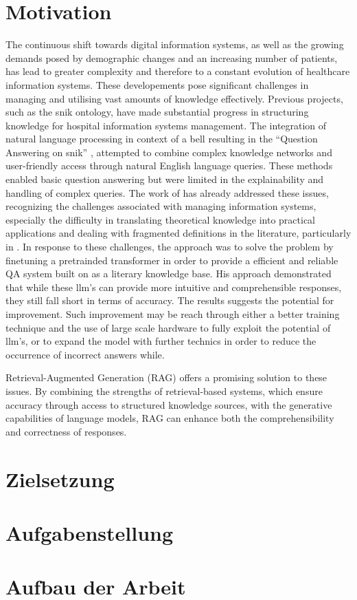 \section{Motivation}
The continuous shift towards digital information systems, as well as the growing demands posed by demographic changes and an increasing number of patients, has lead to greater complexity and therefore to a constant evolution of healthcare information systems. 
These developements pose significant challenges in managing and utilising vast amounts of knowledge effectively. Previous projects, such as the \ac{snik} ontology, have made substantial progress in structuring knowledge for hospital information systems management. 
The integration of natural language processing in context of a \ac{bell} resulting in the \enquote{Question Answering on \ac{snik}} \citep{hannesbell, hannesbell_skill}, attempted to combine complex knowledge networks and user-friendly access through natural English language queries. 
These methods enabled basic question answering but were limited in the explainability and handling of complex queries.
The work of \citet{Paul_Keller} has already addressed these issues, recognizing the challenges associated with managing information systems, especially the difficulty in translating theoretical knowledge into practical applications and dealing with fragmented definitions in the literature, particularly in \citet{bb2}. 
In response to these challenges, the approach was to solve the problem by finetuning a pretrainded transformer in order to provide a efficient and reliable QA system built on \citet{bb2} as a literary knowledge base.
His approach demonstrated that while these \ac{llm}'s can provide more intuitive and comprehensible responses, they still fall short in terms of accuracy. 
The results suggests the potential for improvement. 
Such improvement may be reach through either a better training technique and the use of large scale hardware to fully exploit the potential of \ac{llm}'s, or to expand the model with further technics in order to reduce the occurrence of incorrect answers while.

Retrieval-Augmented Generation (RAG) offers a promising solution to these issues. 
By combining the strengths of retrieval-based systems, which ensure accuracy through access to structured knowledge sources, with the generative capabilities of language models, RAG can enhance both the comprehensibility and correctness of responses. 

\section{Zielsetzung}\label{sec:zielsetzung}


\section{Aufgabenstellung}



\section{Aufbau der Arbeit}
